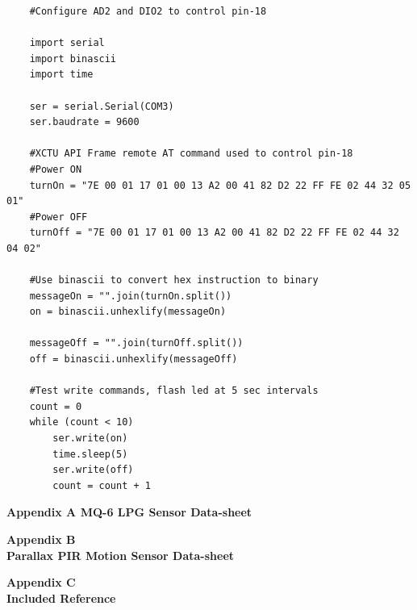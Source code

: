 \documentclass[letter,twocolumn]{report}
\begin{document}
	\begin{lstlisting}
	#Configure AD2 and DIO2 to control pin-18
	
	import serial
	import binascii
	import time
	
	ser = serial.Serial(COM3)
	ser.baudrate = 9600
	
	#XCTU API Frame remote AT command used to control pin-18
	#Power ON
	turnOn = "7E 00 01 17 01 00 13 A2 00 41 82 D2 22 FF FE 02 44 32 05 01"
	#Power OFF
	turnOff = "7E 00 01 17 01 00 13 A2 00 41 82 D2 22 FF FE 02 44 32 04 02"
	
	#Use binascii to convert hex instruction to binary
	messageOn = "".join(turnOn.split()) 
	on = binascii.unhexlify(messageOn)
	
	messageOff = "".join(turnOff.split())
	off = binascii.unhexlify(messageOff)
	
	#Test write commands, flash led at 5 sec intervals
	count = 0
	while (count < 10)
		ser.write(on)
		time.sleep(5)
		ser.write(off)
		count = count + 1
	\end{lstlisting}
	
	\printbibliography		

	\begin{appendices}
		\begin{center}
			\textbf{\Huge Appendix A\label{mq6:MDS} \vfill MQ-6 LPG Sensor Data-sheet}
			
		\end{center}

		
		
		\begin{center}
			\textbf{\vspace{0.35\textheight}\Huge Appendix B\label{PIR:MDS} \\Parallax PIR Motion Sensor Data-sheet}
			\newpage
		\end{center}
		

		\begin{center}
			\textbf{\vspace{0.35\textheight}\Huge Appendix C\label{refs} \\Included Reference}
			\newpage
		\end{center}
	\end{appendices}	
\end{document}
